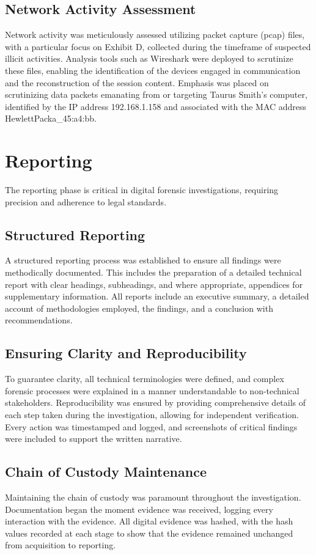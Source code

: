 \subsection{Network Activity Assessment}
Network activity was meticulously assessed utilizing packet capture (pcap) files, with a particular focus on Exhibit D, collected during the timeframe of suspected illicit activities. Analysis tools such as Wireshark were deployed to scrutinize these files, enabling the identification of the devices engaged in communication and the reconstruction of the session content. Emphasis was placed on scrutinizing data packets emanating from or targeting Taurus Smith's computer, identified by the IP address 192.168.1.158 and associated with the MAC address HewlettPacka\_45:a4:bb.


\section{Reporting}
The reporting phase is critical in digital forensic investigations, requiring precision and adherence to legal standards.

\subsection{Structured Reporting}
A structured reporting process was established to ensure all findings were methodically documented. This includes the preparation of a detailed technical report with clear headings, subheadings, and where appropriate, appendices for supplementary information. All reports include an executive summary, a detailed account of methodologies employed, the findings, and a conclusion with recommendations.

\subsection{Ensuring Clarity and Reproducibility}
To guarantee clarity, all technical terminologies were defined, and complex forensic processes were explained in a manner understandable to non-technical stakeholders. Reproducibility was ensured by providing comprehensive details of each step taken during the investigation, allowing for independent verification. Every action was timestamped and logged, and screenshots of critical findings were included to support the written narrative.

\subsection{Chain of Custody Maintenance}
Maintaining the chain of custody was paramount throughout the investigation. Documentation began the moment evidence was received, logging every interaction with the evidence. All digital evidence was hashed, with the hash values recorded at each stage to show that the evidence remained unchanged from acquisition to reporting.


